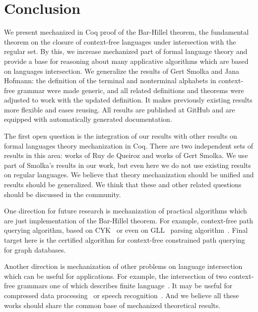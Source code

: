 \section{Conclusion}
\label{sec:conclusion}

We present mechanized in Coq proof of the Bar-Hillel theorem, the fundamental theorem on the closure of context-free languages under intersection with the regular set.
By this, we increase mechanized part of formal language theory and provide a base for reasoning about many applicative algorithms which are based on languages intersection.
We generalize the results of Gert Smolka and Jana Hofmann: the definition of the terminal and nonterminal alphabets in context-free grammar were made generic, and all related definitions and theorems were adjusted to work with the updated definition.
It makes previously existing results more flexible and eases reusing.
All results are published at GitHub and are equipped with automatically generated documentation.

The first open question is the integration of our results with other results on formal languages theory mechanization in Coq. 
There are two independent sets of results in this area: works of Ruy de Queiroz and works of Gert Smolka.
We use part of Smolka's results in our work, but even here we do not use existing results on regular languages.
We believe that theory mechanization should be unified and results should be generalized.
We think that these and other related questions should be discussed in the community.

One direction for future research is mechanization of practical algorithms which are just implementation of the Bar-Hillel theorem.
For example, context-free path querying algorithm, based on CYK~\cite{hellingsPathQuerying,zhang2016context} or even on GLL~\cite{scott2010gll} parsing algorithm~\cite{grigorev2016context}.
Final target here is the certified algorithm for context-free constrained path querying for graph databases.

Another direction is mechanization of other problems on language intersection which can be useful for applications.
For example, the intersection of two context-free grammars one of which describes finite language~\cite{nederhof2002parsing,nederhof2004language}.
It may be useful for compressed data processing~\cite{Lohrey2012AlgorithmicsOS} or speech recognition~\cite{Nederhof:2002:PNC:1073083.1073104,NEDERHOF2004172}.
And we believe all these works should share the common base of mechanized theoretical results.




